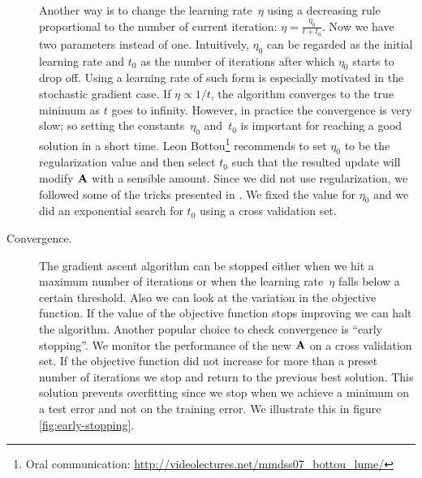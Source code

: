 \begin{description}
	Another way is to change the learning rate~$\eta$ using a decreasing rule proportional to the number of current iteration: $\eta=\frac{\eta_0}{t+t_0}$. Now we have two parameters instead of one. Intuitively, $\eta_0$ can be regarded as the initial learning rate and $t_0$ as the number of iterations after which $\eta_0$ starts to drop off. Using a learning rate of such form is especially motivated in the stochastic gradient case. If $\eta\propto 1/t$, the algorithm converges to the true minimum as $t$ goes to infinity. However, in practice the convergence is very slow; so setting the constants~$\eta_0$ and~$t_0$ is important for reaching a good solution in a short time. Leon Bottou\footnote{Oral communication: \url{http://videolectures.net/mmdss07_bottou_lume/}} recommends to set $\eta_0$ to be the regularization value and then select $t_0$ such that the resulted update will modify $\mathbf{A}$ with a sensible amount. Since we did not use regularization, we followed some of the tricks presented in \citep{lecun1998}. We fixed the value for $\eta_0$ and we did an exponential search for $t_0$ using a cross validation set. 

	 \item[Convergence.] The gradient ascent algorithm can be stopped either when we hit a maximum number of iterations or when the learning rate~$\eta$ falls below a certain threshold. Also we can look at the variation in the objective function. If the value of the objective function stops improving we can halt the algorithm. Another popular choice to check convergence is ``early stopping''. We monitor the performance of the new $\mathbf{A}$ on a cross validation set. If the objective function did not increase for more than a preset number of iterations we stop and return to the previous best solution. This solution prevents overfitting since we stop when we achieve a minimum on a test error and not on the training error. We illustrate this in figure \ref{fig:early-stopping}.
	\end{description}
	
